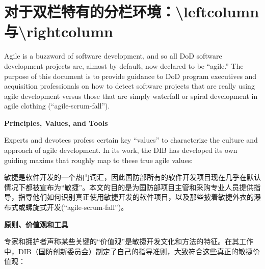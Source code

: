 \documentclass[UTF8, oneside]{ctexbook}
\begin{document}
\section{对于双栏特有的分栏环境：\textbackslash leftcolumn与\textbackslash rightcolumn}
\begin{paracol}{2}
  \begin{leftcolumn}
    Agile is a buzzword of software development, and so all DoD software development projects are, almost by default, now declared to be “agile.” The purpose of this document is to provide guidance to DoD program executives and acquisition professionals on how to detect software projects that are really using agile development versus those that are simply waterfall or spiral development in agile clothing (“agile-scrum-fall”).
    
    \large\textbf{Principles, Values, and Tools}
    
    Experts and devotees profess certain key “values” to characterize the culture and approach of agile development. In its work, the DIB has developed its own guiding maxims that roughly map to these true agile values:
  \end{leftcolumn}
  
  \begin{rightcolumn}
    敏捷是软件开发的一个热门词汇，因此国防部所有的软件开发项目现在几乎在默认情况下都被宣布为“敏捷”。本文的目的是为国防部项目主管和采购专业人员提供指导，指导他们如何识别真正使用敏捷开发的软件项目，以及那些披着敏捷外衣的瀑布式或螺旋式开发(“agile-scrum-fall”)。

    \large\textbf{原则、价值观和工具}

    专家和拥护者声称某些关键的“价值观”是敏捷开发文化和方法的特征。在其工作中，DIB（国防创新委员会）制定了自己的指导准则，大致符合这些真正的敏捷价值观：
  \end{rightcolumn}
\end{paracol}
\end{document}
